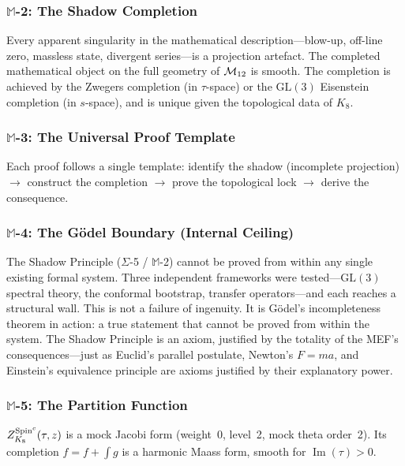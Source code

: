 \subsubsection*{$\mathbb{M}$-2: The Shadow Completion}
\par\smallskip
Every apparent singularity in the mathematical description---blow-up, off-line zero, massless state, divergent series---is a projection artefact.  The completed mathematical object on the full geometry of $\mathcal{M}_{12}$ is smooth.  The completion is achieved by the Zwegers completion (in $\tau$-space) or the $\mathrm{GL}(3)$ Eisenstein completion (in $s$-space), and is unique given the topological data of $K_8$.

\subsubsection*{$\mathbb{M}$-3: The Universal Proof Template}
\par\smallskip
Each proof follows a single template: identify the shadow (incomplete projection) $\to$ construct the completion $\to$ prove the topological lock $\to$ derive the consequence.

\subsubsection*{$\mathbb{M}$-4: The G\"{o}del Boundary (Internal Ceiling)}
\par\smallskip
The Shadow Principle ($\Sigma$-5 / $\mathbb{M}$-2) cannot be proved from within any single existing formal system.  Three independent frameworks were tested---$\mathrm{GL}(3)$ spectral theory, the conformal bootstrap, transfer operators---and each reaches a structural wall.  This is not a failure of ingenuity.  It is G\"odel's incompleteness theorem in action: a true statement that cannot be proved from within the system.  The Shadow Principle is an axiom, justified by the totality of the MEF's consequences---just as Euclid's parallel postulate, Newton's $F = ma$, and Einstein's equivalence principle are axioms justified by their explanatory power.

\subsubsection*{$\mathbb{M}$-5: The Partition Function}
\par\smallskip
$Z_{K_8}^{\text{Spin}^c}(\tau,z)$ is a mock Jacobi form (weight~0, level~2, mock theta order~2).  Its completion $\hat{f} = f + \int g$ is a harmonic Maass form, smooth for $\operatorname{Im}(\tau) > 0$.

